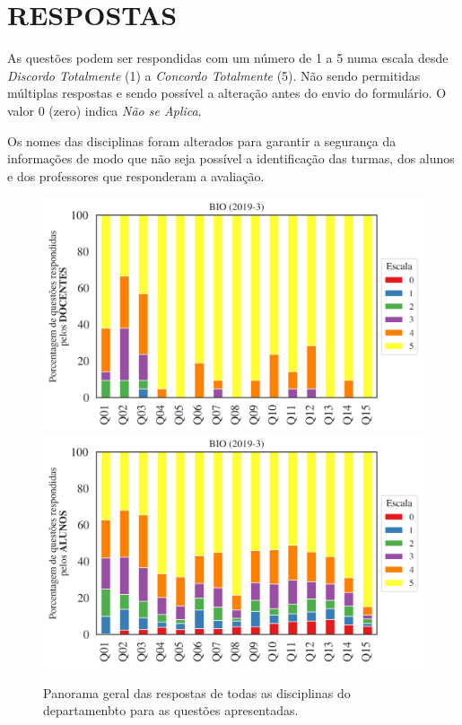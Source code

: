 \documentclass[a4paper,10pt]{article}
\begin{document}
\section{RESPOSTAS}
As questões podem ser respondidas com um número de 1 a 5 numa escala desde {\it Discordo Totalmente} (1) a {\it Concordo Totalmente} (5). Não sendo permitidas múltiplas respostas e sendo possível a alteração antes do envio do formulário. O valor 0 (zero) indica {\it Não se Aplica}.

Os nomes das disciplinas foram alterados para garantir a segurança da informações de modo que não seja possível a identificação das turmas, dos alunos  e dos professores que responderam a avaliação.

\begin{figure}[h]
\centering
\includegraphics[width=0.85\linewidth]{analise_geral_departamento_BIO_docentes.png}
\includegraphics[width=0.85\linewidth]{analise_geral_departamento_BIO_alunos.png}
\caption{\label{fig:analise_geral_departamento}            Panorama geral das respostas de todas as  disciplinas do departamenbto para as questões apresentadas.}
\end{figure}
\end{document}
